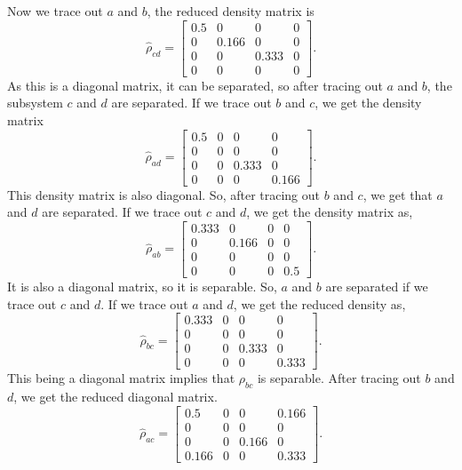\documentclass{scrartcl}
\begin{document}
Now we trace out $a$ and $b$, the reduced density matrix is 
\begin{equation*}
	\hat{\rho}_{cd} = \left[\begin{matrix}0.5 & 0 & 0 & 0\\0 & 0.166 & 0 & 0\\0 & 0 & 0.333 & 0\\0 & 0 & 0 & 0\end{matrix}\right]
	.
\end{equation*}
As this is a diagonal matrix, it can be separated, so after tracing out $a$ and $b$, the subsystem $c$ and $d$ are separated.
If we trace out $b$ and $c$, we get the density matrix
\begin{equation*}
	\hat{\rho}_{ad} =\left[\begin{matrix}0.5 & 0 & 0 & 0\\0 & 0 & 0 & 0\\0 & 0 & 0.333 & 0\\0 & 0 & 0 & 0.166\end{matrix}\right]
	.
\end{equation*}
This density matrix is also diagonal. So, after tracing out $b$ and $c$, we get that $a$ and $d$ are separated. 
If we trace out $c$ and $d$, we get the density matrix as,
\begin{equation*}
	\hat{\rho}_{ab} = \left[\begin{matrix}0.333 & 0 & 0 & 0\\0 & 0.166 & 0 & 0\\0 & 0 & 0 & 0\\0 & 0 & 0 & 0.5\end{matrix}\right]
	.
\end{equation*}
It is also a diagonal matrix, so it is separable. So, $a$ and $b$ are separated if we trace out $c$ and $d$.
If we trace out $a$ and  $d$, we get the reduced density as,
\begin{equation*}
	\hat{\rho}_{bc} = \left[\begin{matrix}0.333 & 0 & 0 & 0\\0 & 0 & 0 & 0\\0 & 0 & 0.333 & 0\\0 & 0 & 0 & 0.333\end{matrix}\right]
	.
\end{equation*}
This being a diagonal matrix implies that $\rho_{bc}$ is separable. After tracing out $b$ and $d$, we get the reduced diagonal matrix.
\begin{equation*}
	\hat{\rho}_{ac} = \left[\begin{matrix}0.5 & 0 & 0 & 0.166\\0 & 0 & 0 & 0\\0 & 0 & 0.166 & 0\\0.166 & 0 & 0 & 0.333\end{matrix}\right]
	.
\end{equation*}
\end{document}
